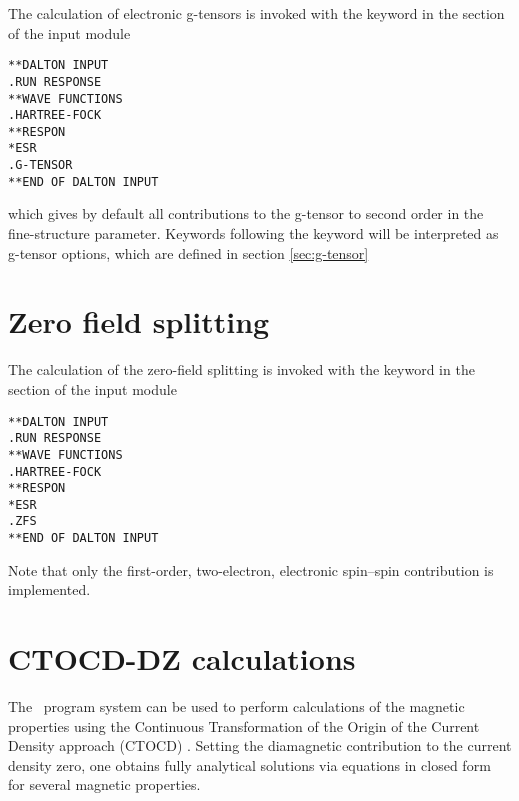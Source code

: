 The calculation of electronic g-tensors is invoked
with the keyword  in the
 section of the  input module

\begin{verbatim}
**DALTON INPUT
.RUN RESPONSE
**WAVE FUNCTIONS
.HARTREE-FOCK
**RESPON
*ESR
.G-TENSOR
**END OF DALTON INPUT
\end{verbatim}
which gives by default all contributions to the g-tensor to second order in
the fine-structure parameter. Keywords following the  keyword
will be interpreted as g-tensor options, which are defined in section
\ref{sec:g-tensor}

\section{Zero field splitting}

\begin{center}
\end{center}
The calculation of the zero-field splitting is invoked
with the keyword  in the
 section of the  input module
\begin{verbatim}
**DALTON INPUT
.RUN RESPONSE
**WAVE FUNCTIONS
.HARTREE-FOCK
**RESPON
*ESR
.ZFS
**END OF DALTON INPUT
\end{verbatim}
Note that only the first-order, two-electron, electronic spin--spin contribution
is implemented.

\section{CTOCD-DZ calculations}\label{sec:ctocd}

The \dalton\ program system can be used to perform calculations of the magnetic
properties using the Continuous Transformation of the Origin of the Current Density
approach (CTOCD) . Setting the diamagnetic contribution
to the current density zero, one obtains fully analytical solutions via equations
in closed form for several magnetic properties.


